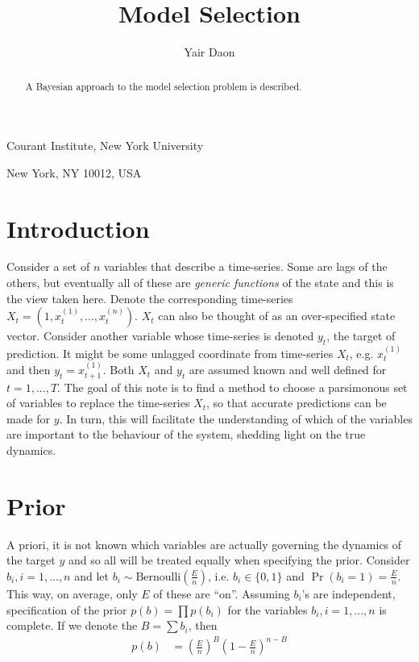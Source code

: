 \documentclass{article}
\theoremstyle{definition}
\newcommand{\tp}[1]{^{(#1)}}
\begin{document}
\title{Model Selection}

\author{Yair Daon}

\maketitle

{\footnotesize 
 \centerline{Courant Institute, New York University}
   \centerline{New York, NY 10012, USA}
}

\bigskip
 
\begin{abstract}
  A Bayesian approach to the model selection problem is described.
\end{abstract}


\section{Introduction}
Consider a set of $n$ variables that describe a time-series. Some are
lags of the others, but eventually all of these are \emph{generic
  functions} of the state and this is the view taken here. Denote the
corresponding time-series $X_t = (1, x_t\tp1,...,x_t\tp{n} )$. $X_t$
can also be thought of as an over-specified state vector. Consider
another variable whose time-series is denoted $y_t$, the target of
prediction. It might be some unlagged coordinate from time-series
$X_t$, e.g. $x_t\tp{1}$ and then $y_t = x_{t+1} \tp{1}$. Both $X_t$
and $y_t$ are assumed known and well defined for $t=1,...,T$. The goal
of this note is to find a method to choose a parsimonous set of
variables to replace the time-series $X_t$, so that accurate
predictions can be made for $y$. In turn, this will facilitate the
understanding of which of the variables are important to the behaviour
of the system, shedding light on the true dynamics.

\section{Prior}
A priori, it is not known which variables are actually governing the
dynamics of the target $y$ and so all will be treated equally when
specifying the prior. Consider $b_i, i=1,...,n$ and let $b_i \sim
\text{Bernoulli}( \frac{E}{n} )$, i.e. $b_i \in \{0,1\}$ and $\Pr( b_i
= 1 ) = \frac{E}{n}$. This way, on average, only $E$ of these are
``on''. Assuming $b_i$'s are independent, specification of the prior
$p(b) = \prod p(b_i)$ for the variables $b_i,i=1,...,n$ is complete.
If we denote the $B = \sum b_i$, then
\begin{align*}
  p(b) &= \left ( \frac{E}{n} \right )^{B} \left ( 1 - \frac{E}{n} \right )^{n-B}
\end{align*}
\end{document}
